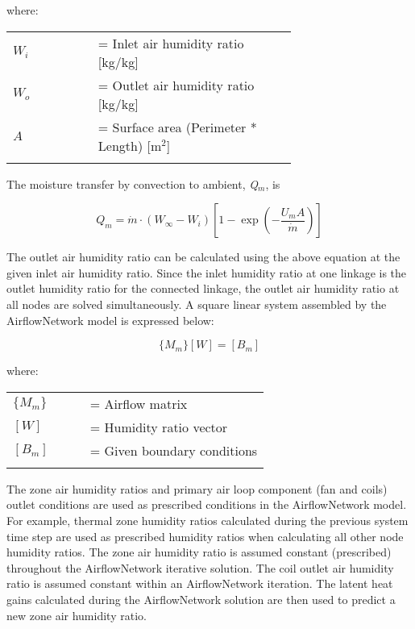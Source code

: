 where:

\begin{tabular}{lp{0.7\linewidth}}
\\
$W_i$ &= Inlet air humidity ratio [kg/kg]\\
$W_o$ &= Outlet air humidity ratio [kg/kg]\\
$A$ &= Surface area (Perimeter * Length) [m\(^{2}\)]\\
\\
\end{tabular}

The moisture transfer by convection to ambient, \emph{Q\(_{m}\)}, is

\begin{equation}
Q_m = \dot{m} \cdot (W_\infty - W_i)\left[ 1 - \exp \left(- \frac{U_m A}{\dot{m}} \right) \right]
\end{equation}

The outlet air humidity ratio can be calculated using the above equation at the given inlet air humidity ratio. Since the inlet humidity ratio at one linkage is the outlet humidity ratio for the connected linkage, the outlet air humidity ratio at all nodes are solved simultaneously. A square linear system assembled by the AirflowNetwork model is expressed below:

\begin{equation}
\{M_m\} [W] = [B_m]
\end{equation}

where:

\begin{tabular}{lp{0.7\linewidth}}
\\
$\{M_m\}$ &= Airflow matrix\\
$[W]$ &= Humidity ratio vector\\
$[B_m]$ &= Given boundary conditions\\
\\
\end{tabular}

The zone air humidity ratios and primary air loop component (fan and coils) outlet conditions are used as prescribed conditions in the AirflowNetwork model. For example, thermal zone humidity ratios calculated during the previous system time step are used as prescribed humidity ratios when calculating all other node humidity ratios. The zone air humidity ratio is assumed constant (prescribed) throughout the AirflowNetwork iterative solution. The coil outlet air humidity ratio is assumed constant within an AirflowNetwork iteration. The latent heat gains calculated during the AirflowNetwork solution are then used to predict a new zone air humidity ratio.


